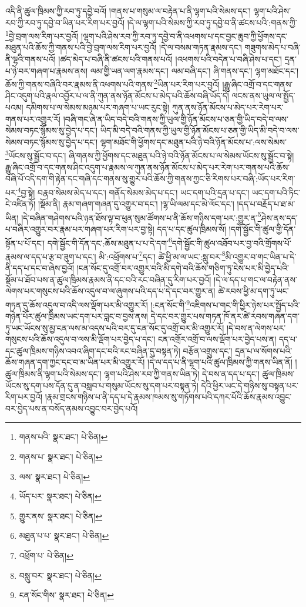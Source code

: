 འདི་ནི་ཚུལ་ཁྲིམས་ཀྱི་རབ་ཏུ་དབྱེ་བའོ། །གནས་པ་གསུམ་ལ་བརྟེན་པ་ནི་ལྷག་པའི་སེམས་དང་། ལྷག་པའི་ཤེས་རབ་ཀྱི་རབ་ཏུ་དབྱེ་བ་ཡིན་པར་རིག་པར་བྱའོ། །དེ་ལ་ལྷག་པའི་སེམས་ཀྱི་རབ་ཏུ་དབྱེ་བ་ནི་ཚངས་པའི་:གནས་ཀྱི་\footnote{གནས་པའི་  སྣར་ཐང་།  པེ་ཅིན། }བྱེ་བྲག་ལས་རིག་པར་བྱའོ། །ལྷག་པའི་ཤེས་རབ་ཀྱི་རབ་ཏུ་དབྱེ་བ་ནི་འཕགས་པ་དང་བྱང་ཆུབ་ཀྱི་ཕྱོགས་དང་མཐུན་པའི་ཆོས་ཀྱི་གནས་པའི་བྱེ་བྲག་ལས་རིག་པར་བྱའོ། །དེ་ལ་བསམ་གཏན་རྣམས་དང་། གཟུགས་མེད་པ་བཞི་ནི་ལྷའི་གནས་པའོ། །ཚད་མེད་པ་བཞི་ནི་ཚངས་པའི་གནས་པའོ། །འཕགས་པའི་བདེན་པ་བཞི་ཤེས་པ་དང་། དྲན་པ་ཉེ་བར་གཞག་པ་རྣམས་ནས། ལམ་གྱི་ཡན་ལག་རྣམས་དང་། ལམ་བཞི་དང་། ཞི་གནས་དང་། ལྷག་མཐོང་དང་། ཆོས་ཀྱི་གནས་བཞིའི་བར་རྣམས་ནི་འཕགས་པའི་གནས་\footnote{གནས་པ་  སྣར་ཐང་།  པེ་ཅིན། }ཡིན་པར་རིག་པར་བྱའོ། །རྒྱུ་ཞིང་འགྲོ་བ་དང་གནས་ཤིང་འདུག་པའི་རྣལ་འབྱོར་པ་ལ་ནི་ཀུན་ནས་ཉོན་མོངས་པ་མེད་པའི་ཆོས་བཞི་ཡོད་དེ། ལངས་ནས་ཡུལ་ལ་སྤྱོད་པའམ། དམིགས་པ་ལ་སེམས་མཉམ་པར་གཞག་པ་ཡང་རུང་སྟེ། ཀུན་ནས་ཉོན་མོངས་པ་མེད་པར་རེག་པར་གནས་པར་འགྱུར་རོ། །བཞི་གང་ཞེ་ན་ཡིད་བདེ་བའི་གནས་ཀྱི་ཡུལ་གྱི་ཉོན་མོངས་པ་ཅན་གྱི་ཡིད་བདེ་བ་ལས་སེམས་བཏང་སྙོམས་སུ་བྱེད་པ་དང་། ཡིད་མི་བདེ་བའི་གནས་ཀྱི་ཡུལ་གྱི་ཉོན་མོངས་པ་ཅན་གྱི་ཡིད་མི་བདེ་བ་ལས་སེམས་བཏང་སྙོམས་སུ་བྱེད་པ་དང་། ལྷག་མཐོང་གི་ཕྱོགས་དང་མཐུན་པའི་ཉེ་བའི་ཉོན་མོངས་པ་:ལས་སེམས་\footnote{ལས་  སྣར་ཐང་།  པེ་ཅིན། }ཡོངས་སུ་སྦྱོང་བ་དང་། ཞི་གནས་ཀྱི་ཕྱོགས་དང་མཐུན་པའི་ཉེ་བའི་ཉོན་མོངས་པ་ལ་སེམས་ཡོངས་སུ་སྦྱོང་བ་སྟེ། རྒྱུ་ཞིང་འགྲོ་བ་དང་གནས་ཤིང་འདུག་པ་རྣམས་ལ་ཀུན་ནས་ཉོན་མོངས་པ་མེད་པར་རེག་པར་གནས་པའི་ཆོས་བཞི་པོ་འདི་དག་གི་རྟེན་དང་གཞི་དང་གནས་སུ་གྱུར་པའི་ཆོས་ཀྱི་གནས་ཀྱང་ཅི་རིགས་པར་བཞི་:ཡོད་པར་རིག་པར་\footnote{ཡོད་པར་  སྣར་ཐང་།  པེ་ཅིན། }བྱ་སྟེ། བརྣབ་སེམས་མེད་པ་དང་། གནོད་སེམས་མེད་པ་དང་། ཡང་དག་པའི་དྲན་པ་དང་། ཡང་དག་པའི་ཏིང་ངེ་འཛིན་ཏོ། །སྡོམ་ནི། རྣམ་གཞག་གཞན་དུ་འགྱུར་བ་དང་། །ལྷ་ཡི་ལམ་དང་མེ་ལོང་དང་། །དད་པ་བརྗོད་པ་ཐ་མ་ཡིན། །དེ་བཞིན་གཤེགས་པའི་ཉན་ཐོས་ལྟ་བ་ཕུན་སུམ་ཚོགས་པ་ནི་ཆོས་གཉིས་དག་པར་:གྱུར་ན་\footnote{གྱུར་ནས་  སྣར་ཐང་།  པེ་ཅིན། }ཤེས་ནས་དད་པ་བཞིར་འགྱུར་བར་རྣམ་པར་གཞག་པར་རིག་པར་བྱ་སྟེ། དད་པ་དང་ཚུལ་ཁྲིམས་སོ། །དགེ་སྦྱོང་གི་ཚུལ་གྱི་དོན་སྟོན་པ་པོ་དང་། དགེ་སྦྱོང་གི་དོན་དང་:ཆོས་མཐུན་པ་པ་དེ་དག་\footnote{མཐུན་པ་པ་  སྣར་ཐང་།  པེ་ཅིན། }དགེ་སྦྱོང་གི་ཚུལ་འཐོབ་པར་བྱ་བའི་གྲོགས་པོ་རྣམས་ལ་དད་པ་རྩ་བ་ཟུག་པ་དང་། མི་:འཕྲོགས་པ་\footnote{འཕྲོག་པ་  པེ་ཅིན། }དང་། ཚེ་ཕྱི་མ་ལ་ཡང་:སླུ་བར་\footnote{བསླུ་བར་  སྣར་ཐང་།  པེ་ཅིན། }མི་འགྱུར་བ་གང་ཡིན་པ་དེ་ནི་དད་པ་དང་བ་ཞེས་བྱའོ། །ངན་སོང་དུ་འགྲོ་བར་འགྱུར་བའི་མི་དགེ་བའི་ཆོས་གཅིག་ཏུ་ངེས་པར་མི་བྱེད་པའི་སྡོམ་པ་ཐོབ་པས་ན་ཚུལ་ཁྲིམས་རྣམས་ནི་དང་བའི་རང་བཞིན་དུ་རིག་པར་བྱའོ། །དེ་ལ་དད་པ་གང་ལ་བརྟེན་ནས་ལེགས་པར་གསུངས་པའི་ཆོས་འདུལ་བ་ལ་ཞུགས་པའི་དད་པ་དེ་དང་བར་གྱུར་ན། ཚེ་རབས་ཕྱི་མ་དག་ཏུ་ཡང་གཏན་དུ་ཆོས་འདུལ་བ་འདི་ལས་ལྡོག་པར་མི་འགྱུར་རོ། །:ངན་སོང་གི་\footnote{ངན་སོང་གིས་  སྣར་ཐང་།  པེ་ཅིན། }འཇིགས་པ་གང་གི་ཕྱིར་ཉེས་པར་སྤྱོད་པའི་གཉེན་པོར་ཚུལ་ཁྲིམས་ཡང་དག་པར་བླང་བ་བྱས་ནས། དེ་དང་བར་གྱུར་པས་གཏན་ཁོ་ནར་ཚེ་རབས་གཞན་དག་ཏུ་ཡང་ཡོངས་སུ་མྱ་ངན་ལས་མ་འདས་པའི་བར་དུ་ངན་སོང་དུ་འགྲོ་བར་མི་འགྱུར་རོ། །དེ་བས་ན་ལེགས་པར་གསུངས་པའི་ཆོས་འདུལ་བ་ལས་མི་ལྡོག་པར་བྱེད་པ་དང་། ངན་འགྲོར་འགྲོ་བ་ལས་ལྡོག་པར་བྱེད་པས་ན། དད་པ་དང་ཚུལ་ཁྲིམས་གཉིས་འབའ་ཞིག་དང་བའི་རང་བཞིན་དུ་བསྟན་ཏེ། བརྩོན་འགྲུས་དང་། དྲན་པ་ལ་སོགས་པའི་ཆོས་གཞན་དག་ཀྱང་དང་བ་མ་ཡིན་པར་མི་འགྱུར་རོ། །དེ་ལ་དད་པ་ནི་ལྷག་པའི་ཚུལ་ཁྲིམས་ཀྱི་གནས་ཡིན་ནོ། །ཚུལ་ཁྲིམས་ནི་ལྷག་པའི་སེམས་དང་། ལྷག་པའི་ཤེས་རབ་ཀྱི་གནས་ཡིན་ཏེ། དེ་བས་ན་དད་པ་དང་། ཚུལ་ཁྲིམས་ཡོངས་སུ་དག་པས་དོན་དུ་ན་བསླབ་པ་གསུམ་ཡོངས་སུ་དག་པར་བསྟན་ཏེ། དེའི་ཕྱིར་ཡང་དེ་གཉིས་སུ་བསྟན་པར་རིག་པར་བྱའོ། །རྣམ་གྲངས་གཉིས་པ་ནི་དད་པ་དེ་རྣམས་ཁམས་སུ་གཏོགས་པའི་དཀར་པོའི་ཆོས་རྣམས་འབྱུང་བར་བྱེད་པས་ན་བསོད་ནམས་འབྱུང་བར་བྱེད་པའོ། 